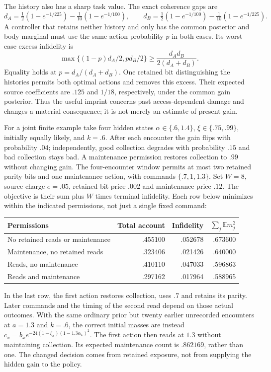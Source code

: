 \documentclass[11pt]{article}
\theoremstyle{definition}
\theoremstyle{remark}
\begin{document}
The history also has a sharp task value. The exact coherence gaps are
\[
 d_A=\tfrac12(1-e^{-1/225})-\tfrac1{10}(1-e^{-1/100}),\qquad
 d_B=\tfrac12(1-e^{-1/100})-\tfrac1{10}(1-e^{-1/225}).
\]
A controller that retains neither history and only has the
common posterior and body marginal must use the same action probability $p$
in both cases. Its worst-case excess infidelity is
\[
 \max\{(1-p)d_A/2,pd_B/2\}\ge
 \frac{d_Ad_B}{2(d_A+d_B)}.
\]
Equality holds at $p=d_A/(d_A+d_B)$. One retained bit distinguishing the
histories permits both optimal actions and removes this excess. Their expected
source coefficients are $.125$ and $1/18$, respectively, under the common
gain posterior. Thus the useful imprint concerns past access-dependent damage
and changes a material consequence; it is not merely an estimate of present gain.

For a joint finite example take four hidden states
$\alpha\in\{.6,1.4\}$, $\xi\in\{.75,.99\}$, initially equally likely,
and $k=.6$. After each encounter the gain flips with probability $.04$;
independently, good collection degrades with probability $.15$ and bad
collection stays bad. A maintenance permission restores collection to $.99$
without changing gain. The four-encounter window permits at most two retained
parity bits and one maintenance action, with commands $\{.7,1,1.3\}$.
Set $W=8$, source charge $e=.05$, retained-bit price $.002$ and maintenance
price $.12$. The objective is their sum plus $W$ times terminal infidelity.
Each row below minimizes within the indicated permissions, not just a single
fixed command:
\begin{center}
\begin{tabular}{@{}lrrr@{}}
\toprule
Permissions & Total account & Infidelity & $\sum_j\mathbb E m_j^2$\\
\midrule
No retained reads or maintenance & .455100 & .052678 & .673600\\
Maintenance, no retained reads & .323406 & .021426 & .640000\\
Reads, no maintenance & .410110 & .047033 & .596863\\
Reads and maintenance & .297162 & .017964 & .588965\\
\bottomrule
\end{tabular}
\end{center}
In the last row, the first action restores collection, uses $.7$ and retains
its parity. Later commands and the timing of the second read depend on those
actual outcomes. With the same ordinary prior but twenty earlier unrecorded
encounters at $a=1.3$ and $k=.6$, the correct initial masses are instead
$c_x=b_xe^{-24(1-\xi_x)(1-1.3\alpha_x)^2}$. The first action then reads
at $1.3$ without maintaining collection. Its expected maintenance count is
$.862169$, rather than one. The changed decision comes from retained exposure,
not from supplying the hidden gain to the policy.
\end{document}

